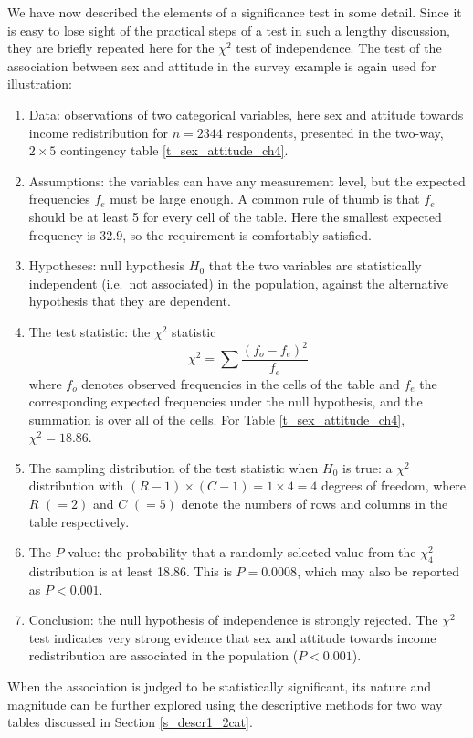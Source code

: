 We have now described the elements of a significance test in some
detail. Since it is easy to lose sight of the practical steps of a test
in such a lengthy discussion, they are briefly repeated here for the
$\chi^{2}$ test of independence.
The test of
the association between sex and attitude in the survey example is again used for illustration:
\begin{enumerate}
\item
Data: observations of two categorical variables, here sex and
attitude towards income redistribution for $n=2344$ respondents, presented in
the two-way, $2\times 5$ contingency table \ref{t_sex_attitude_ch4}.
\item
Assumptions: the variables can have any measurement level, but the expected
frequencies $f_{e}$ must be large enough. A common rule of thumb is that
$f_{e}$ should be at least 5 for every cell of the table. Here the
smallest expected frequency is 32.9, so the requirement is comfortably
satisfied.
\item
Hypotheses: null hypothesis $H_{0}$ that the two
variables are statistically independent (i.e.\ not associated) in the
population, against the alternative hypothesis that they are dependent.
\item
The test statistic: the $\chi^{2}$ statistic
\[
\chi^{2} = \sum
\frac{(f_{o}-f_{e})^{2}}{f_{e}}
\]
where $f_{o}$ denotes observed
frequencies in the cells of the table and $f_{e}$ the corresponding
expected frequencies under the null hypothesis,
and the summation is over all of the cells. For Table
\ref{t_sex_attitude_ch4}, $\chi^{2}=18.86$.
\item
The sampling distribution of
the test statistic when $H_{0}$ is true: a $\chi^{2}$ distribution with
$(R-1)\times(C-1)=1\times 4=4$ degrees of freedom, where $R$ $(=2)$ and
$C$ $(=5)$ denote the numbers of rows and columns in the table
respectively.
\item
The $P$-value: the probability that a randomly
selected value from the $\chi^{2}_{4}$ distribution is at least 18.86.
This is $P=0.0008$, which may also be reported as $P<0.001$.
\item
Conclusion: the null hypothesis of independence is strongly rejected.
The $\chi^{2}$ test indicates very strong evidence that sex and
attitude towards income redistribution are associated in the population
($P<0.001$).
\end{enumerate}
When the association is judged to be
statistically significant, its nature and magnitude can be further
explored using the descriptive methods for two way tables discussed in Section
\ref{s_descr1_2cat}.
